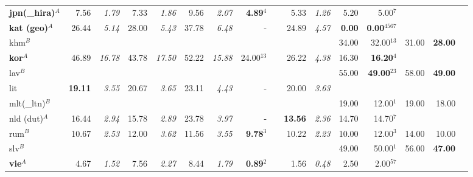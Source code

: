 \begin{landscape}
{\begin{tabularx}{1.65\textwidth}{Xrrrrrrrrrr|rrrrr}
\textbf{jpn(\_hira)$^A$}& 7.56 &\textit{1.79} & 7.33  &\textit{1.86} & 9.56  &\textit{2.07} &\textbf{4.89$^4$} && 5.33         &\textit{1.26} & 5.20  &  5.00$^{7}$  &       &       & \\
\textbf{kat (geo)$^A$}& 26.44  &\textit{5.14} & 28.00 &\textit{5.43} & 37.78 &\textit{6.48} &       -         & & 24.89        &\textit{4.57} &\textbf{0.00}  &\textbf{0.00$^{4567}$} &       &       & \\
khm$^B$ 	    &              &              &       &              &       &              &                 & &              &              & 34.00 & 32.00$^{13}$ & 31.00 & \textbf{28.00} & \\
\textbf{kor$^A$}& 46.89        &\textit{16.78}& 43.78 &\textit{17.50}& 52.22 &\textit{15.88}& 24.00$^{13}$    & & 26.22        &\textit{4.38} & 16.30 & \textbf{16.20$^{4}$}  &       &       & \\
lav$^B$ 	    &              &              &       &              &       &              &                 & &              &              & 55.00 & \textbf{49.00$^{23}$} & 58.00 & \textbf{49.00} & \\
lit 	        &\textbf{19.11}&\textit{3.55} & 20.67 &\textit{3.65} & 23.11 &\textit{4.43} & -               & & 20.00        &\textit{3.63} &       &              &       &       & \\
mlt(\_ltn)$^B$  &              &              &       &              &       &              &                 & &              &              & 19.00 & 12.00$^{1}$  & 19.00 & 18.00 & \\
nld (dut)$^A$   & 16.44        &\textit{2.94} & 15.78 &\textit{2.89} & 23.78 &\textit{3.97} &  -              & &\textbf{13.56}&\textit{2.36} & 14.70 & 14.70$^{7}$  &       &       & \\
rum$^B$ 	    & 10.67        &\textit{2.53} & 12.00 &\textit{3.62} & 11.56 &\textit{3.55} &\textbf{9.78$^3$} && 10.22        &\textit{2.23} & 10.00 & 12.00$^{3}$  & 14.00 & 10.00 & \\
slv$^B$ 	    &              &              &       &              &       &              &                  &&              &              & 49.00 & 50.00$^{1}$  & 56.00 & \textbf{47.00} & \\
\textbf{vie$^A$}& 4.67         &\textit{1.52} & 7.56  &\textit{2.27} & 8.44  &\textit{1.79} &\textbf{0.89$^2$} &&  1.56        &\textit{0.48} & 2.50  &  2.00$^{57}$ &       &       & \\


\end{tabularx}}
\end{landscape}
